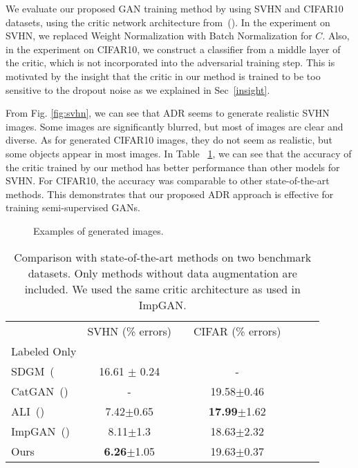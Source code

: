 \documentclass{article} \usepackage{iclr2018_conference,times}
\begin{document}
 We evaluate our proposed GAN training method by using SVHN and CIFAR10 datasets, using the critic network architecture from~(\cite{salimans2016improved}). In the experiment on SVHN, we replaced Weight Normalization with Batch Normalization for $C$. Also, in the experiment on CIFAR10, we construct a classifier from a middle layer of the critic, which is not incorporated into the adversarial training step. This is motivated by the insight that the critic in our method is trained to be too sensitive to the dropout noise as we explained in Sec~\ref{insight}. 


 From Fig. \ref{fig:svhn}, we can see that ADR seems to generate realistic SVHN images. Some images are significantly blurred, but most of images are clear and diverse.  As for generated CIFAR10 images, they do not seem as realistic, but some objects appear in most images.
In Table~ \ref{table:exp_gan}, we can see that the accuracy of the critic trained by our method has better performance than other models for SVHN. For CIFAR10, the accuracy was comparable to other state-of-the-art methods. This demonstrates that our proposed ADR approach is effective for training semi-supervised GANs. 
\begin{figure}[t]
\begin{minipage}{0.49\hsize}
  \centering
\end{minipage}
\begin{minipage}{0.49\hsize}
  \centering
\end{minipage}
\vspace{-2mm}
\caption{Examples of generated images. }
\label{fig:gan_image}
\end{figure}

\begin{table}[t]
\begin{center}
  \begin{tabular}{lcccccc}
\toprule
& SVHN (\% errors) &&CIFAR (\% errors)\\
Labeled Only &&&&\\\hline
SDGM~(\cite{maaloe2016auxiliary}&16.61 $\pm$ 0.24&&-&&\\
CatGAN~(\cite{springenberg2015unsupervised})&- & &19.58$\pm$0.46&&\\
ALI~(\cite{dumoulin2016adversarially})&7.42$\pm$0.65&&{\bf 17.99}$\pm$1.62\\
  ImpGAN~(\cite{salimans2016improved})&8.11$\pm$1.3 & &18.63$\pm$2.32&&\\\hline

 Ours  &{\bf 6.26}$\pm$1.05&&19.63$\pm$0.37\\
 \hline
  \end{tabular}
    \caption{Comparison with state-of-the-art methods on two benchmark datasets. Only methods without data augmentation are included. We used the same critic architecture as used in ImpGAN.}
\label{table:exp_gan}
\end{center}
\end{table}
\end{document}
